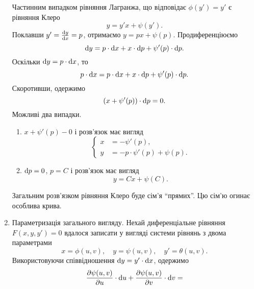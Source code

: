 \begin{enumerate}
	Частинним випадком рівняння Лагранжа, що відповідає $\phi(y') = y'$ є рівняння Клеро
 	\begin{equation*}
 		y = y' x + \psi(y').
 	\end{equation*}
	Поклавши $y' = \frac{\mathop{}\!\mathrm{d} y}{\mathop{}\!\mathrm{d} x} = p$, отримаємо $y = p x + \psi(p)$. Продиференціюємо 
	\begin{equation*}
		\mathop{}\!\mathrm{d} y = p \cdot \mathop{}\!\mathrm{d} x + x \cdot \mathop{}\!\mathrm{d} p + \psi'(p) \cdot \mathop{}\!\mathrm{d} p.
	\end{equation*}
	Оскільки $\mathop{}\!\mathrm{d} y = p \cdot \mathop{}\!\mathrm{d} x$, то
	\begin{equation*}
		p \cdot \mathop{}\!\mathrm{d} x = p \cdot \mathop{}\!\mathrm{d} x + x \cdot \mathop{}\!\mathrm{d} p + \psi'(p) \cdot \mathop{}\!\mathrm{d} p.
	\end{equation*}
	Скоротивши, одержимо
	\begin{equation*}
		(x + \psi'(p)) \cdot \mathop{}\!\mathrm{d} p = 0.
	\end{equation*}
	Можливі два випадки.
	\begin{enumerate}
		\item $x + \psi'(p) - 0$ і розв’язок має вигляд
		\begin{equation*}
			\left\{\begin{aligned}
				x &= - \psi'(p), \\
				y &= -p \cdot \psi'(p) + \psi(p).
			\end{aligned}\right.
		\end{equation*}
		\item $\mathop{}\!\mathrm{d} p = 0$, $p = C$ і розв’язок має вигляд
		\begin{equation*}
			y = C x + \psi(C).
		\end{equation*}
	\end{enumerate}
	Загальним розв’язком рівняння Клеро буде сім’я ``прямих''. Цю сім’ю огинає особлива крива.
	\item Параметризація загального вигляду. Нехай диференціальне рівняння $F(x, y, y') = 0$ вдалося записати у вигляді системи рівнянь з двома параметрами
	\begin{equation*}
		x = \phi(u, v), \quad y = \psi(u, v), \quad y' = \theta(u, v).	
	\end{equation*}
	Використовуючи співвідношення $\mathop{}\!\mathrm{d} y = y' \cdot \mathop{}\!\mathrm{d} x$, одержимо
	\begin{multline}
		\frac{\partial \psi(u,v)}{\partial u} \cdot \diff u + \frac{\partial \psi(u, v)}{\partial v} \cdot \diff v = \\

\end{multline}
\end{enumerate}
